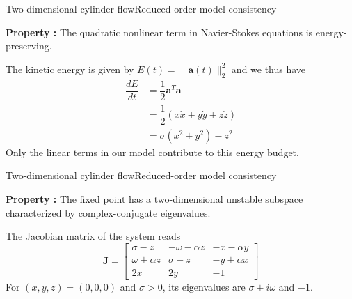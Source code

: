 \documentclass[usenames,dvipsnames,svgnames,10pt,aspectratio=169]{beamer}
\begin{document}
\begin{frame}[t, c]{Two-dimensional cylinder flow}{Reduced-order model consistency}
  \begin{tcolorbox}[colback=white, colframe=beamer@kthblue]
    \textbf{Property :} The quadratic nonlinear term in Navier-Stokes equations is energy-preserving.
  \end{tcolorbox}
  
  \bigskip
  
  The kinetic energy is given by $E(t) = \| \bm{a}(t) \|_2^2$ and we thus have
  \[
  \begin{aligned}
    \dfrac{dE}{dt} & = \dfrac{1}{2} \bm{a}^T \dot{\bm{a}} \\
    & = \dfrac{1}{2} \left( x  \dot{x} + y \dot{y} + z \dot{z} \right) \\
    & = \sigma (x^2 + y^2) - z^2
  \end{aligned}
  \]
  Only the linear terms in our model contribute to this energy budget.
\end{frame}




\begin{frame}[t, c]{Two-dimensional cylinder flow}{Reduced-order model consistency}
  \begin{tcolorbox}[colback=white, colframe=beamer@kthblue]
    \textbf{Property :} The fixed point has a two-dimensional unstable subspace characterized by complex-conjugate eigenvalues.
  \end{tcolorbox}
  
  \bigskip
  
  The Jacobian matrix of the system reads
  \[
  \bm{J} = \begin{bmatrix}
    \sigma - z & -\omega - \alpha z & -x - \alpha y \\
    \omega + \alpha z & \sigma - z & -y + \alpha x\\
    2x & 2y & -1
  \end{bmatrix}
  \]
  For $(x, y, z) = (0, 0, 0)$ and $\sigma > 0$, its eigenvalues are $\sigma \pm i \omega$ and $-1$.
\end{frame}




  
\end{document}
